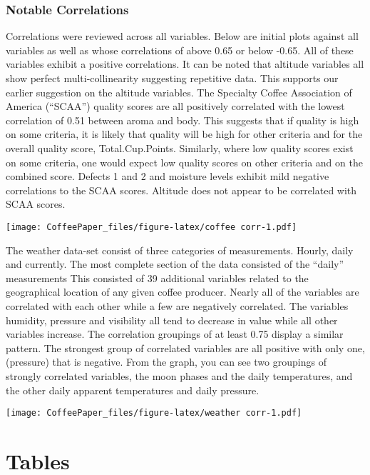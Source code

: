 \documentclass[
  12pt,
  english,
  man]{apa6}
\begin{document}
\hypertarget{notable-correlations}{%
\subsubsection{Notable Correlations}\label{notable-correlations}}

Correlations were reviewed across all variables. Below are initial plots against all variables as well as whose correlations of above 0.65 or below -0.65. All of these variables exhibit a positive correlations. It can be noted that altitude variables all show perfect multi-collinearity suggesting repetitive data. This supports our earlier suggestion on the altitude variables. The Specialty Coffee Association of America (\enquote{SCAA}) quality scores are all positively correlated with the lowest correlation of 0.51 between aroma and body. This suggests that if quality is high on some criteria, it is likely that quality will be high for other criteria and for the overall quality score, Total.Cup.Points. Similarly, where low quality scores exist on some criteria, one would expect low quality scores on other criteria and on the combined score. Defects 1 and 2 and moisture levels exhibit mild negative correlations to the SCAA scores. Altitude does not appear to be correlated with SCAA scores.

\texttt{[image: CoffeePaper\_files/figure-latex/coffee corr-1.pdf]}

The weather data-set consist of three categories of measurements. Hourly, daily and currently. The most complete section of the data consisted of the \enquote{daily} measurements This consisted of 39 additional variables related to the geographical location of any given coffee producer. Nearly all of the variables are correlated with each other while a few are negatively correlated. The variables humidity, pressure and visibility all tend to decrease in value while all other variables increase. The correlation groupings of at least 0.75 display a similar pattern. The strongest group of correlated variables are all positive with only one,(pressure) that is negative. From the graph, you can see two groupings of strongly correlated variables, the moon phases and the daily temperatures, and the other daily apparent temperatures and daily pressure.

\texttt{[image: CoffeePaper\_files/figure-latex/weather corr-1.pdf]}

\hypertarget{tables}{%
\section{Tables}\label{tables}}
\end{document}
